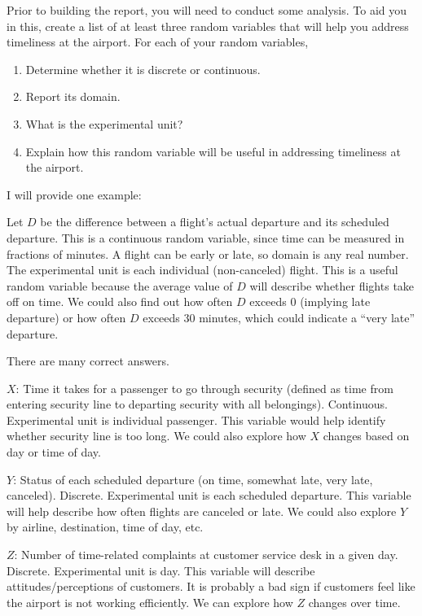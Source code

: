 \documentclass[
]{book}
\begin{document}
Prior to building the report, you will need to conduct some analysis. To aid you in this, create a list of at least three random variables that will help you address timeliness at the airport. For each of your random variables,

\begin{enumerate}
\def\labelenumi{\alph{enumi}.}
\item
  Determine whether it is discrete or continuous.
\item
  Report its domain.
\item
  What is the experimental unit?
\item
  Explain how this random variable will be useful in addressing timeliness at the airport.
\end{enumerate}

I will provide one example:

Let \(D\) be the difference between a flight's actual departure and its scheduled departure. This is a continuous random variable, since time can be measured in fractions of minutes. A flight can be early or late, so domain is any real number. The experimental unit is each individual (non-canceled) flight. This is a useful random variable because the average value of \(D\) will describe whether flights take off on time. We could also find out how often \(D\) exceeds 0 (implying late departure) or how often \(D\) exceeds 30 minutes, which could indicate a ``very late'' departure.

There are many correct answers.

\(X\): Time it takes for a passenger to go through security (defined as time from entering security line to departing security with all belongings). Continuous. Experimental unit is individual passenger. This variable would help identify whether security line is too long. We could also explore how \(X\) changes based on day or time of day.

\(Y\): Status of each scheduled departure (on time, somewhat late, very late, canceled). Discrete. Experimental unit is each scheduled departure. This variable will help describe how often flights are canceled or late. We could also explore \(Y\) by airline, destination, time of day, etc.

\(Z\): Number of time-related complaints at customer service desk in a given day. Discrete. Experimental unit is day. This variable will describe attitudes/perceptions of customers. It is probably a bad sign if customers feel like the airport is not working efficiently. We can explore how \(Z\) changes over time.
\end{document}
